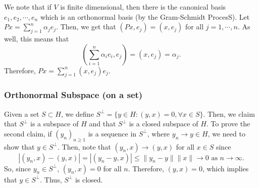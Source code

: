 \documentclass[12pt]{article}
\newcommand{\sbs}{\subset}
\begin{document}
\vspace{-25pt}
We note that if $V$ is finite dimensional, then there is the canonical basis $e_1, e_2, \cdots, e_n$ which is an orthonormal basis (by the Gram-Schmidt ProcesS). Let $Px = \sum\limits_{j =1}^n \alpha_j e_j$. Then, we get that $(Px, e_j) = (x, e_j)$ for all $j = 1, \cdots, n$. As well, this means that 
\[ \left( \sum\limits_{i=1}^n \alpha_i e_i, e_j\right) = (x, e_j) = \alpha_j. \]
Therefore, $Px = \sum\limits_{j =1}^n (x, e_j) e_j$.
\vspace{-20pt}
\subsubsection*{Orthonormal Subspace (on a set)}
\vspace{-20pt}
Given a set $S \sbs H$, we define $S^{\perp} = \{ y \in H : (y, x) = 0, \forall x \in S \}$. Then, we claim that $S^{\perp}$ is a subspace of $H$ and that $S^{\perp}$ is a closed subspace of $H$. To prove the second claim, if $(y_n)_{n \geq 1}$ is a sequence in $S^{\perp}$, where $y_n \to y \in H$, we need to show that $y \in S^{\perp}$. Then, note that $(y_n, x) \to (y, x)$ for all $x \in S$ since 
\[ |(y_n, x) - (y, x)| = |(y_n - y, x)| \leq \| y_n - y \| \| x \| \to 0 \text{ as } n \to \infty.\]
So, since $y_n \in S^{\perp}$, $(y_n, x) = 0$ for all $n$. Therefore, $(y, x) = 0$, which implies that $y \in S^{\perp}$. Thus, $S^{\perp}$ is closed. 
\vspace{-20pt}
\end{document}
